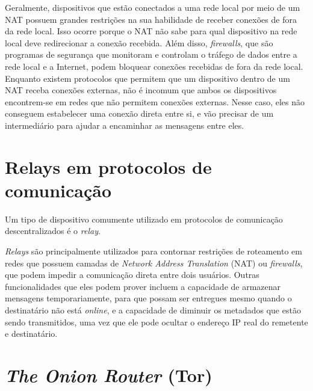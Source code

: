 Geralmente, dispositivos que estão conectados a uma rede local por meio de um NAT possuem grandes restrições na sua habilidade de receber conexões de fora da rede local. Isso ocorre porque o NAT não sabe para qual dispositivo na rede local deve redirecionar a conexão recebida. Além disso, \textit{firewalls}, que são programas de segurança que monitoram e controlam o tráfego de dados entre a rede local e a Internet, podem bloquear conexões recebidas de fora da rede local. Enquanto existem protocolos que permitem que um dispositivo dentro de um NAT receba conexões externas, não é incomum que ambos os dispositivos encontrem-se em redes que não permitem conexões externas. Nesse caso, eles não conseguem estabelecer uma conexão direta entre si, e vão precisar de um intermediário para ajudar a encaminhar as mensagens entre eles.

\section {Relays em protocolos de comunicação}

Um tipo de dispositivo comumente utilizado em protocolos de comunicação descentralizados é o \textit{relay}.


\textit{Relays} são principalmente utilizados para contornar restrições de roteamento em redes que possuem camadas de \textit{Network Address Translation} (NAT) ou \textit{firewalls}, que podem impedir a comunicação direta entre dois usuários. Outras funcionalidades que eles podem prover incluem a capacidade de armazenar mensagens temporariamente, para que possam ser entregues mesmo quando o destinatário não está \textit{online}, e a capacidade de diminuir os metadados que estão sendo transmitidos, uma vez que ele pode ocultar o endereço IP real do remetente e destinatário.

\section{\textit{The Onion Router} (Tor)}

